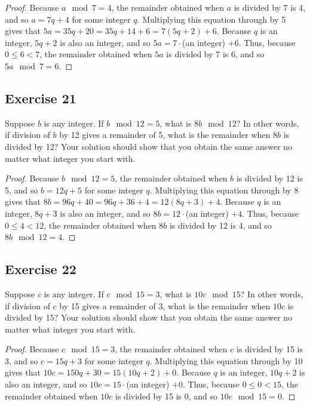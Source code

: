 \documentclass[14pt]{extarticle}
\begin{document}
\begin{proof}
    Because $a \mod 7 = 4$, the remainder obtained when $a$ is divided by 7 is 4, and so $a = 7q + 4$ for some integer $q$. Multiplying this equation through by 5 gives that $5a = 35q + 20 = 35q + 14 + 6 = 7(5q + 2) + 6$. Because $q$ is an integer, $5q + 2$ is also an integer, and so $5a = 7\cdot$(an integer) $+ 6$. Thus, because $0 \leq 6 < 7$, the remainder obtained when $5a$ is divided by 7 is 6, and so $5a \mod 7 = 6$.
\end{proof}

\subsection{Exercise 21}
Suppose $b$ is any integer. If $b \mod 12 = 5$, what is $8b \mod 12$? In other words, if division of $b$ by 12 gives a remainder of 5, what is the remainder when $8b$ is divided by 12? Your solution should show that you obtain the same answer no matter what integer you start with.

\begin{proof}
    Because $b \mod 12 = 5$, the remainder obtained when $b$ is divided by 12 is 5, and so $b = 12q + 5$ for some integer $q$. Multiplying this equation through by 8 gives that $8b = 96q + 40 = 96q + 36 + 4 = 12(8q + 3) + 4$. Because $q$ is an integer, $8q + 3$ is also an integer, and so $8b = 12\cdot$(an integer) $+ 4$. Thus, because $0 \leq 4 < 12$, the remainder obtained when $8b$ is divided by 12 is 4, and so $8b \mod 12 = 4$.
\end{proof}

\subsection{Exercise 22}
Suppose $c$ is any integer. If $c \mod 15 = 3$, what is $10c \mod 15$? In other words, if division of $c$ by 15 gives a remainder of 3, what is the remainder when $10c$ is divided by 15? Your solution should show that you obtain the same answer no matter what integer you start with.

\begin{proof}
    Because $c \mod 15 = 3$, the remainder obtained when $c$ is divided by 15 is 3, and so $c = 15q + 3$ for some integer $q$. Multiplying this equation through by 10 gives that $10c = 150q + 30 = 15(10q + 2) + 0$. Because $q$ is an integer, $10q + 2$ is also an integer, and so $10c = 15\cdot$(an integer) $+ 0$. Thus, because $0 \leq 0 < 15$, the remainder obtained when $10c$ is divided by 15 is 0, and so $10c \mod 15 = 0$.
\end{proof}
\end{document}

